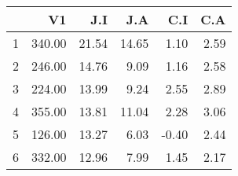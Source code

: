\begin{table}[ht]
\centering
\begin{tabular}{rrrrrr}
  \hline
 & V1 & J.I & J.A & C.I & C.A \\ 
  \hline
1 & 340.00 & 21.54 & 14.65 & 1.10 & 2.59 \\ 
  2 & 246.00 & 14.76 & 9.09 & 1.16 & 2.58 \\ 
  3 & 224.00 & 13.99 & 9.24 & 2.55 & 2.89 \\ 
  4 & 355.00 & 13.81 & 11.04 & 2.28 & 3.06 \\ 
  5 & 126.00 & 13.27 & 6.03 & -0.40 & 2.44 \\ 
  6 & 332.00 & 12.96 & 7.99 & 1.45 & 2.17 \\ 
   \hline
\end{tabular}
\end{table}
